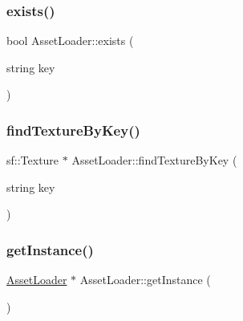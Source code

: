 \hypertarget{class_asset_loader_a02606bccd43e16913919b3e081f74f3e}{}\label{class_asset_loader_a02606bccd43e16913919b3e081f74f3e} 
\subsubsection{\texorpdfstring{exists()}{exists()}}
{\footnotesize\ttfamily bool Asset\+Loader\+::exists (\begin{DoxyParamCaption}\item[{string}]{key }\end{DoxyParamCaption})}

\hypertarget{class_asset_loader_a0f8159b836b5d23aadf4439cba9d5e84}{}\label{class_asset_loader_a0f8159b836b5d23aadf4439cba9d5e84} 
\subsubsection{\texorpdfstring{find\+Texture\+By\+Key()}{findTextureByKey()}}
{\footnotesize\ttfamily sf\+::\+Texture $\ast$ Asset\+Loader\+::find\+Texture\+By\+Key (\begin{DoxyParamCaption}\item[{string}]{key }\end{DoxyParamCaption})}

\hypertarget{class_asset_loader_a84f304e93bb704447080e2e722e6d413}{}\label{class_asset_loader_a84f304e93bb704447080e2e722e6d413} 
\subsubsection{\texorpdfstring{get\+Instance()}{getInstance()}}
{\footnotesize\ttfamily \hyperlink{class_asset_loader}{Asset\+Loader} $\ast$ Asset\+Loader\+::get\+Instance (\begin{DoxyParamCaption}{ }\end{DoxyParamCaption})\hspace{0.3cm}{\ttfamily [static]}}

\hypertarget{class_asset_loader_aa91b6dc15ed3f4befbd0c74bc1d7f040}{}\label{class_asset_loader_aa91b6dc15ed3f4befbd0c74bc1d7f040} 
